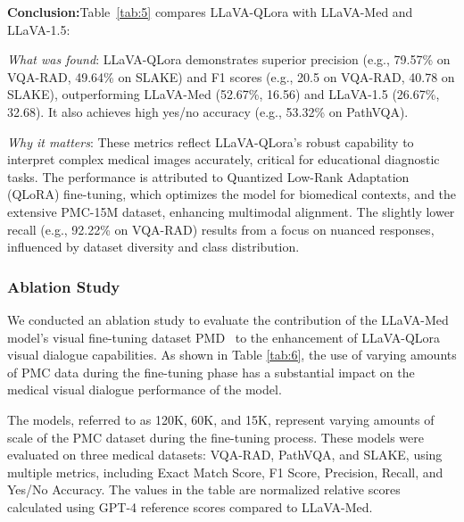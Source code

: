\documentclass[10pt,letterpaper]{article}
\begin{document}
\textbf{Conclusion:}Table~\ref{tab:5} compares LLaVA-QLora with LLaVA-Med and LLaVA-1.5:

 \textit{What was found}: LLaVA-QLora demonstrates superior precision (e.g., 79.57\% on VQA-RAD, 49.64\% on SLAKE) and F1 scores (e.g., 20.5 on VQA-RAD, 40.78 on SLAKE), outperforming LLaVA-Med (52.67\%, 16.56) and LLaVA-1.5 (26.67\%, 32.68). It also achieves high yes/no accuracy (e.g., 53.32\% on PathVQA). 

 \textit{Why it matters}: These metrics reflect LLaVA-QLora’s robust capability to interpret complex medical images accurately, critical for educational diagnostic tasks. The performance is attributed to Quantized Low-Rank Adaptation (QLoRA) fine-tuning, which optimizes the model for biomedical contexts, and the extensive PMC-15M dataset, enhancing multimodal alignment. The slightly lower recall (e.g., 92.22\% on VQA-RAD) results from a focus on nuanced responses, influenced by dataset diversity and class distribution.




\subsubsection*{Ablation Study}

We conducted an ablation study to evaluate the contribution of the LLaVA-Med model's visual fine-tuning dataset PMD~\cite{lin2023pmc} to the enhancement of LLaVA-QLora visual dialogue capabilities. As shown in Table \ref{tab:6}, the use of varying amounts of PMC data during the fine-tuning phase has a substantial impact on the medical visual dialogue performance of the model.

The models, referred to as 120K, 60K, and 15K, represent varying amounts of scale of the PMC dataset during the fine-tuning process. These models were evaluated on three medical datasets: VQA-RAD, PathVQA, and SLAKE, using multiple metrics, including Exact Match Score, F1 Score, Precision, Recall, and Yes/No Accuracy. The values in the table are normalized relative scores calculated using GPT-4 reference scores compared to LLaVA-Med.
\end{document}
